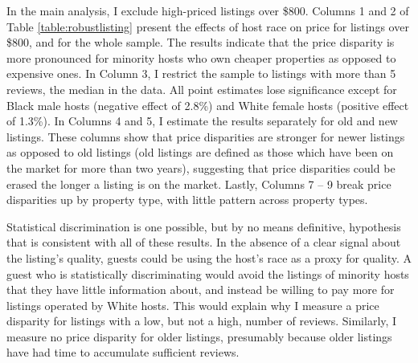 In the main analysis, I exclude high-priced listings over \$800. Columns 1 and 2 of Table \ref{table:robustlisting} present the effects of host race on price for listings over \$800, and for the whole sample. The results indicate that the price disparity is more pronounced for minority hosts who own cheaper properties as opposed to expensive ones. In Column 3, I restrict the sample to listings with more than 5 reviews, the median in the data. All point estimates lose significance except for Black male hosts (negative effect of 2.8\%) and White female hosts (positive effect of 1.3\%). In Columns 4 and 5, I estimate the results separately for old and new listings. These columns show that price disparities are stronger for newer listings as opposed to old listings (old listings are defined as those which have been on the market for more than two years), suggesting that price disparities could be erased the longer a listing is on the market. Lastly, Columns 7 -- 9 break price disparities up by property type, with little  pattern across property types.

Statistical discrimination is one possible, but by no means definitive, hypothesis that is consistent with all of these results. In the absence of a clear signal about the listing's quality, guests could be using the host's race as a proxy for quality. A guest who is statistically discriminating would avoid the listings of minority hosts that they have little information about, and instead be willing to pay more for listings operated by White hosts. This would explain why I measure a price disparity for listings with a low, but not a high, number of reviews. Similarly, I measure no price disparity for older listings, presumably because older listings have had time to accumulate sufficient reviews. 



